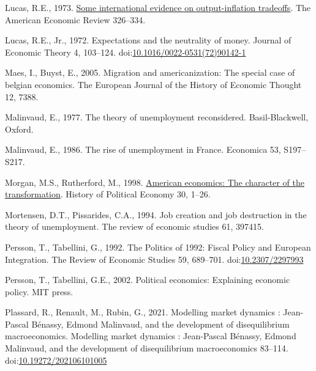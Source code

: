 \documentclass[
  12pt,
  onecolumn]{article}
\newlength{\cslhangindent}
\newlength{\cslentryspacingunit} %
\newenvironment{CSLReferences}[2] %
 {%
  \setlength{\parindent}{0pt}
  \ifodd #1
  \let\oldpar\par
  \def\par{\hangindent=\cslhangindent\oldpar}
  \fi
  \setlength{\parskip}{#2\cslentryspacingunit}
 }%
 {}
\begin{document}
\begin{CSLReferences}{1}{0}
\leavevmode{}%
Lucas, R.E., 1973. \href{http://www.jstor.org/stable/1914364}{Some
international evidence on output-inflation tradeoffs}. The American
Economic Review 326--334.

\leavevmode{}%
Lucas, R.E., Jr., 1972. Expectations and the neutrality of money.
Journal of Economic Theory 4, 103--124.
doi:\href{https://doi.org/10.1016/0022-0531(72)90142-1}{10.1016/0022-0531(72)90142-1}

\leavevmode{}%
Maes, I., Buyst, E., 2005. Migration and americanization: The special
case of belgian economics. The European Journal of the History of
Economic Thought 12, 7388.

\leavevmode{}%
Malinvaud, E., 1977. The theory of unemployment reconsidered.
{Basil-Blackwell}, {Oxford}.

\leavevmode{}%
Malinvaud, E., 1986. The rise of unemployment in {France}. Economica 53,
S197--S217.

\leavevmode{}%
Morgan, M.S., Rutherford, M., 1998.
\href{http://search.ebscohost.com/login.aspx?direct=true\&db=bth\&AN=7752144\&lang=fr\&site=ehost-live}{American
economics: The character of the transformation}. History of Political
Economy 30, 1--26.

\leavevmode{}%
Mortensen, D.T., Pissarides, C.A., 1994. Job creation and job
destruction in the theory of unemployment. The review of economic
studies 61, 397415.

\leavevmode{}%
Persson, T., Tabellini, G., 1992. The {Politics} of 1992: {Fiscal
Policy} and {European Integration}. The Review of Economic Studies 59,
689--701. doi:\href{https://doi.org/10.2307/2297993}{10.2307/2297993}

\leavevmode{}%
Persson, T., Tabellini, G.E., 2002. Political economics: Explaining
economic policy. {MIT press}.

\leavevmode{}%
Plassard, R., Renault, M., Rubin, G., 2021. Modelling market dynamics :
{Jean-Pascal Bénassy}, {Edmond Malinvaud}, and the development of
disequilibrium macroeconomics. Modelling market dynamics : Jean-Pascal
Bénassy, Edmond Malinvaud, and the development of disequilibrium
macroeconomics 83--114.
doi:\href{https://doi.org/10.19272/202106101005}{10.19272/202106101005}


\end{CSLReferences}
\end{document}
